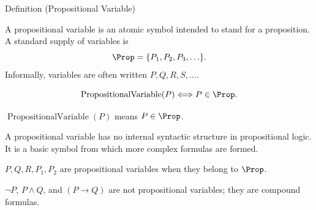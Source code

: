 \DefinitionalRoot
\begin{definitionbox}{Definition (Propositional Variable)}
\begin{definition}
\label{def:propositional-variable}
A propositional variable is an atomic symbol intended to stand for a proposition. A standard supply of variables is
\[
\Prop=\{P_1,P_2,P_3,\ldots\}.
\]
Informally, variables are often written \(P,Q,R,S,\ldots\).
\end{definition}
\end{definitionbox}

\begin{remark*}
\[
\operatorname{PropositionalVariable}(P)\Longleftrightarrow P\in\Prop.
\]
\end{remark*}

\begin{remark*}
\(\operatorname{PropositionalVariable}(P)\) means \(P\in\Prop\).
\end{remark*}

\begin{remark*}[Interpretation]
A propositional variable has no internal syntactic structure in propositional logic. It is a basic symbol from which more complex formulas are formed.
\end{remark*}

\begin{remark*}[Examples]
\(P,Q,R,P_1,P_2\) are propositional variables when they belong to \(\Prop\).
\end{remark*}

\begin{remark*}
\(\neg P\), \(P\land Q\), and \((P\to Q)\) are not propositional variables; they are compound formulas.
\end{remark*}

